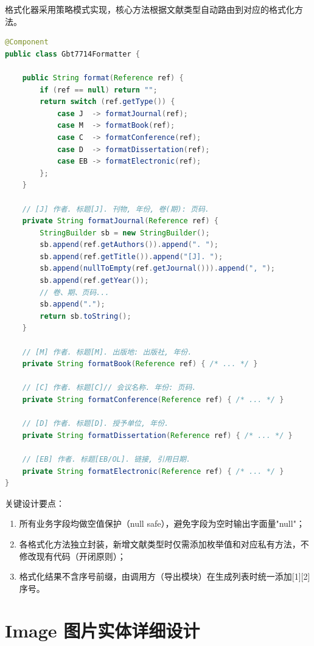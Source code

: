 \documentclass{../softeng}
\begin{document}
格式化器采用策略模式实现，核心方法根据文献类型自动路由到对应的格式化方法。

\begin{lstlisting}[language=Java,caption={Gbt7714Formatter 核心算法}]
@Component
public class Gbt7714Formatter {

    public String format(Reference ref) {
        if (ref == null) return "";
        return switch (ref.getType()) {
            case J  -> formatJournal(ref);
            case M  -> formatBook(ref);
            case C  -> formatConference(ref);
            case D  -> formatDissertation(ref);
            case EB -> formatElectronic(ref);
        };
    }

    // [J] 作者. 标题[J]. 刊物, 年份, 卷(期): 页码.
    private String formatJournal(Reference ref) {
        StringBuilder sb = new StringBuilder();
        sb.append(ref.getAuthors()).append(". ");
        sb.append(ref.getTitle()).append("[J]. ");
        sb.append(nullToEmpty(ref.getJournal())).append(", ");
        sb.append(ref.getYear());
        // 卷、期、页码...
        sb.append(".");
        return sb.toString();
    }

    // [M] 作者. 标题[M]. 出版地: 出版社, 年份.
    private String formatBook(Reference ref) { /* ... */ }

    // [C] 作者. 标题[C]// 会议名称. 年份: 页码.
    private String formatConference(Reference ref) { /* ... */ }

    // [D] 作者. 标题[D]. 授予单位, 年份.
    private String formatDissertation(Reference ref) { /* ... */ }

    // [EB] 作者. 标题[EB/OL]. 链接, 引用日期.
    private String formatElectronic(Reference ref) { /* ... */ }
}
\end{lstlisting}

关键设计要点：
\begin{enumerate}
    \item 所有业务字段均做空值保护（null safe），避免字段为空时输出字面量"null"；
    \item 各格式化方法独立封装，新增文献类型时仅需添加枚举值和对应私有方法，不修改现有代码（开闭原则）；
    \item 格式化结果不含序号前缀，由调用方（导出模块）在生成列表时统一添加[1][2]序号。
\end{enumerate}

\section{Image 图片实体详细设计}
\end{document}
